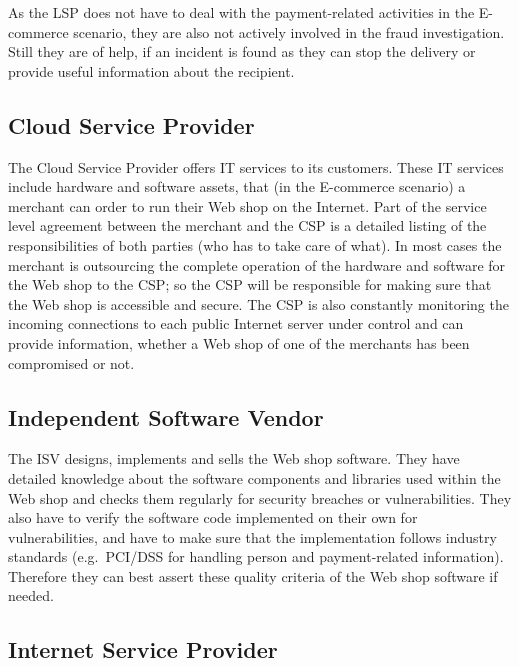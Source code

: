 As the \gls{LSP} does not have to deal with the payment-related activities in the \gls{E-commerce} scenario, they are also not actively involved in the fraud investigation. Still they are of help, if an incident is found as they can stop the delivery or provide useful information about the recipient.


\subsection{Cloud Service Provider}
\label{subsec:stakeholder_csp}

The Cloud Service Provider offers \gls{IT} services to its customers. These \gls{IT} services include hardware and software assets, that (in the \gls{E-commerce} scenario) a merchant can order to run their Web shop on the Internet. Part of the service level agreement between the merchant and the \gls{CSP} is a detailed listing of the responsibilities of both parties (who has to take care of what). In most cases the merchant is outsourcing the complete operation of the hardware and software for the Web shop to the \gls{CSP}; so the \gls{CSP} will be responsible for making sure that the Web shop is accessible and secure. The \gls{CSP} is also constantly monitoring the incoming connections to each public Internet server under control and can provide information, whether a Web shop of one of the merchants has been compromised or not.


\subsection{Independent Software Vendor}
\label{subsec:stakeholder_isv}

The \gls{ISV} designs, implements and sells the Web shop software. They have detailed knowledge about the software components and libraries used within the Web shop and checks them regularly for security breaches or vulnerabilities. They also have to verify the software code implemented on their own for vulnerabilities, and have to make sure that the implementation follows industry standards (e.g.\ \gls{PCI/DSS} for handling person and payment-related information). Therefore they can best assert these quality criteria of the Web shop software if needed.


\subsection{Internet Service Provider}
\label{subsec:stakeholder_isp}

